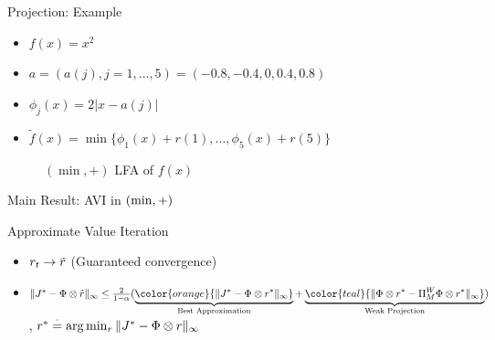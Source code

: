 \documentclass[10pt]{beamer}
\begin{document}
\begin{frame}{Projection: Example}
\begin{itemize}
\item $f(x)=x^2$
\item $a=(a(j),j=1,\ldots,5)=(-0.8,-0.4,0,0.4,0.8)$
\item $\phi_j(x)=2|x-a(j)|$
\item $\tilde{f}(x)=\min\{\phi_1(x)+r(1),\ldots,\phi_5(x)+r(5)\}$
\end{itemize}
\begin{figure}\label{illust}
\caption*{$(\min,+)$ LFA of $f(x)$}
\label{minptrans}
\end{figure}

\end{frame}




\begin{frame}[fragile]{Main Result: AVI in $(\min,+)$}
\begin{algorithm}[H]
\caption*{Approximate Value Iteration}
\begin{algorithmic}[1]
\STATE{\}}
\end{algorithmic}
\end{algorithm}
\p
\begin{block}{\cite{chandrashekar2014approximate}}
\begin{itemize}
\item $r_t \rightarrow \tilde{r}$ (Guaranteed convergence) \p
\item $\norm{J^*-\Phi\om \tr}_\infty\leq \frac{2}{1-\alpha}(\underbrace{\color{orange}{\norm{J^*-\Phi\om r^*}_\infty}}_{\text{Best Approximation}}+\underbrace{\color{teal}{\norm{\Phi\om r^*-\Pi_M^W \Phi\om r^*}_\infty}}_{\text{Weak Projection}})$,
$r^*\stackrel{\cdot}{=}\arg\min_{r}\|J^*-\Phi \otimes r\|_\infty$
\end{itemize}
\end{block}

\end{frame}
\end{document}
